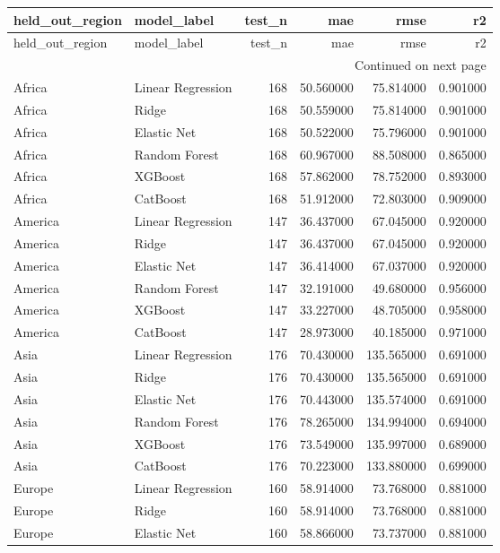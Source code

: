 \begin{longtable}{llrrrr}
\toprule
held\_out\_region & model\_label & test\_n & mae & rmse & r2 \\
\midrule
\endfirsthead
\toprule
held\_out\_region & model\_label & test\_n & mae & rmse & r2 \\
\midrule
\endhead
\midrule
\multicolumn{6}{r}{Continued on next page} \\
\midrule
\endfoot
\bottomrule
\endlastfoot
Africa & Linear Regression & 168 & 50.560000 & 75.814000 & 0.901000 \\
Africa & Ridge & 168 & 50.559000 & 75.814000 & 0.901000 \\
Africa & Elastic Net & 168 & 50.522000 & 75.796000 & 0.901000 \\
Africa & Random Forest & 168 & 60.967000 & 88.508000 & 0.865000 \\
Africa & XGBoost & 168 & 57.862000 & 78.752000 & 0.893000 \\
Africa & CatBoost & 168 & 51.912000 & 72.803000 & 0.909000 \\
America & Linear Regression & 147 & 36.437000 & 67.045000 & 0.920000 \\
America & Ridge & 147 & 36.437000 & 67.045000 & 0.920000 \\
America & Elastic Net & 147 & 36.414000 & 67.037000 & 0.920000 \\
America & Random Forest & 147 & 32.191000 & 49.680000 & 0.956000 \\
America & XGBoost & 147 & 33.227000 & 48.705000 & 0.958000 \\
America & CatBoost & 147 & 28.973000 & 40.185000 & 0.971000 \\
Asia & Linear Regression & 176 & 70.430000 & 135.565000 & 0.691000 \\
Asia & Ridge & 176 & 70.430000 & 135.565000 & 0.691000 \\
Asia & Elastic Net & 176 & 70.443000 & 135.574000 & 0.691000 \\
Asia & Random Forest & 176 & 78.265000 & 134.994000 & 0.694000 \\
Asia & XGBoost & 176 & 73.549000 & 135.997000 & 0.689000 \\
Asia & CatBoost & 176 & 70.223000 & 133.880000 & 0.699000 \\
Europe & Linear Regression & 160 & 58.914000 & 73.768000 & 0.881000 \\
Europe & Ridge & 160 & 58.914000 & 73.768000 & 0.881000 \\
Europe & Elastic Net & 160 & 58.866000 & 73.737000 & 0.881000 \\

\end{longtable}
